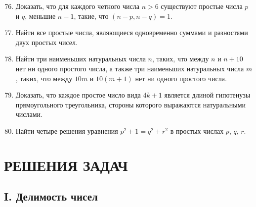 \documentclass[12pt, a4paper, openany]{book}
\begin{document}
\begin{enumerate}
	\setcounter{enumi}{75}
	\item Доказать, что для каждого четного числа $n>6$ существуют простые числа $p$ и $q$, меньшие $n-1$, такие, что $(n-p, n-q)=1$.
	\item Найти все простые числа, являющиеся одновременно суммами и разностями двух простых чисел.
	\item Найти три наименьших натуральных числа $n$, таких, что между $n$ и $n+10$ нет ни одного простого числа, а также три наименьших натуральных числа $m$, таких, что между $10m$ и $10(m+1)$ нет ни одного простого числа.
	\item Доказать, что каждое простое число вида $4k+1$ является длиной гипотенузы прямоугольного треугольника, стороны которого выражаются натуральными числами.
	\item Найти четыре решения уравнения $p^2+1 = q^2 + r^2$ в простых числах $p$, $q$, $r$.
	
\end{enumerate}












































\newpage

\section[Решения задач]{\center РЕШЕНИЯ ЗАДАЧ}
\subsection[I. Делимость чисел]{\center I. Делимость чисел}
\end{document}
